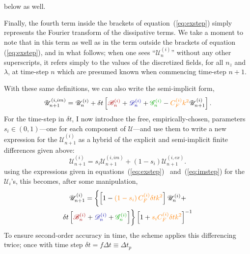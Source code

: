 \documentclass[12pt, letterpaper, oneside, leqno, openright]{memoir}
\newcommand{\bfield}{\mathscr{B}}
\newcommand{\dfield}{\mathscr{D}}
\newcommand{\gfield}{\mathscr{G}}
\newcommand{\ufield}{\mathscr{U}}
\begin{document}
below as well. 
%
\par
%
Finally, the fourth term inside the brackets of equation~(\ref{eq:exstep})
simply represents the Fourier transform of the dissipative terms. We take a
moment to note that in this term as well as in the term outside the brackets
of equation (\ref{eq:exstep}), and in what follows; when one sees
``$\ufield^{(i)}_n$'' without any other superscripts, it refers simply to 
the values of the discretized fields, for all $n_z$ and $\lambda$, at 
time-step $n$ which are presumed known when commencing time-step $n+1$.
%
\par
%
With these same definitions, we can also write the semi-implicit form,
%
\begin{equation}
  \ufield_{n+1}^{(i,im)} = \ufield^{(i)}_n
  + \delta t\left[
                    {\color{red!65!black}  \bfield^{(i)}_n}
                  + {\color{blue!65!black} \dfield^{(i)}_n}
                  + {\color{green!65!black}\gfield^{(i)}_n}
                  - {\color{orange}C^{(i)}_F k^2}
                  \ufield^{(i)}_{n+1}
           \right].
  \label{eq:imstep}
\end{equation}
%
For the time-step in $\delta t$, I now introduce the free,
empirically-chosen, parameters $s_i\in (0,1)$---one for
each component of $\ufield$---and use them to write a new
expression for the $\ufield^{(i)}_{n+1}$ as a hybrid of the
explicit and semi-implicit finite differences given above:
%
\begin{equation}
  \ufield^{(i)}_{n+1} = s_i\ufield^{(i,im)}_{n+1} + (1-s_i)\ufield^{(i,ex)}_{n+1}.
\end{equation}
%
using the expressions given in equations~(\ref{eq:exstep})~
and~(\ref{eq:imstep}) for the $\ufield_i$'s, this becomes,
after some manipulation,
%
\begin{multline}
  \ufield^{(i)}_{n+1} = \biggl\{
%
   \left[
            1 
            - {\color{orange}\left(1-s_i\right)C^{(i)}_F\delta t k^2}
  \right] 
%
  \ufield^{(i)}_n 
  + \\
  \delta t\left[
                  {\color{red!65!black}  \bfield^{(i)}_n}
                + {\color{blue!65!black} \dfield^{(i)}_n}
                + {\color{green!65!black}\gfield^{(i)}_n}
         \right]
                    \biggr\}
   \left[      1
   + {\color{orange}s_iC^{(i)}_F\delta t k^2}
  \right]^{-1}
\end{multline}
%
To ensure second-order accuracy in time, the scheme applies this
differencing twice; once with time step $\delta t = f\Delta t\equiv\Delta t_p$ 
\end{document}
